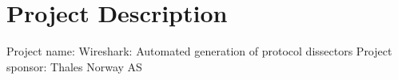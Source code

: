 \chapter{Project Description}
Project name: Wireshark: Automated generation of protocol dissectors
Project sponsor: Thales Norway AS
